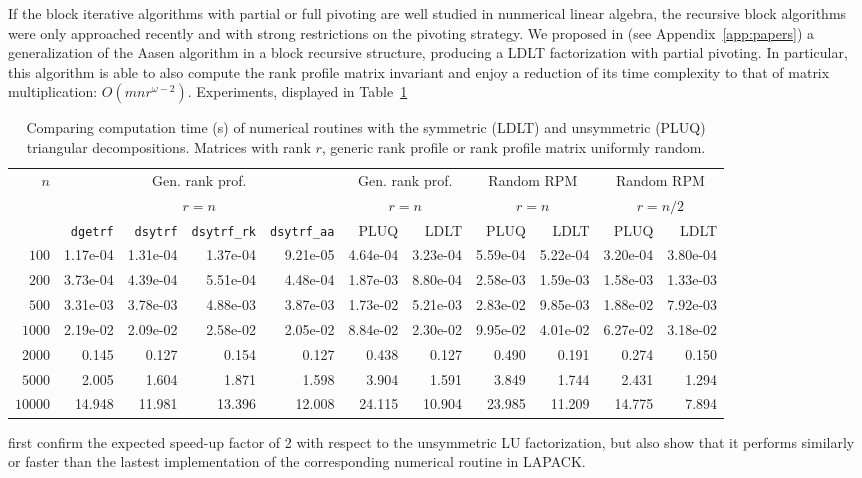 \documentclass{deliverablereport}
\begin{document}
If the block iterative algorithms with partial or full pivoting are well studied
in nunmerical linear algebra, the recursive block algorithms were only
approached recently and with strong restrictions on the pivoting strategy.
We proposed in \cite{DuPe18} (see Appendix~\ref{app:papers}) a generalization of the Aasen algorithm in a block
recursive structure, producing a LDLT factorization with partial pivoting. In
particular, this algorithm is able to also compute the rank profile matrix
invariant and enjoy a reduction of its time complexity to that of matrix
multiplication: $O(mnr^{\omega-2})$. Experiments, displayed in
Table~\ref{tab:ldlt}
%
\begin{table}[htb]\centering
  \footnotesize
    \begin{tabular}{rrrrrrrrrrr}
  \toprule
  \multirow{3}{*}{$n$} & 
  \multicolumn{4}{c}{Gen. rank prof.} & \multicolumn{2}{c}{Gen. rank prof.} &
  \multicolumn{2}{c}{Random RPM} & \multicolumn{2}{c}{Random RPM}\\
  &\multicolumn{4}{c}{ $r=n$}&\multicolumn{2}{c}{ $r=n$}&
  \multicolumn{2}{c}{ $r=n$}&\multicolumn{2}{c}{ $r=n/2$}\\
  & \texttt{dgetrf} & \texttt{dsytrf} & \texttt{dsytrf\_rk} & \texttt{dsytrf\_aa} & PLUQ & LDLT & PLUQ& LDLT & PLUQ & LDLT\\
  \midrule
$100$   & 1.17e-04 & 1.31e-04 & 1.37e-04 & 9.21e-05 & 4.64e-04 & 3.23e-04 & 5.59e-04 & 5.22e-04 & 3.20e-04 & 3.80e-04\\
$200$   & 3.73e-04 & 4.39e-04 & 5.51e-04 & 4.48e-04 & 1.87e-03 & 8.80e-04 & 2.58e-03 & 1.59e-03 & 1.58e-03 & 1.33e-03\\
$500$   & 3.31e-03 & 3.78e-03 & 4.88e-03 & 3.87e-03 & 1.73e-02 & 5.21e-03 & 2.83e-02 & 9.85e-03 & 1.88e-02 & 7.92e-03\\
$1000$  & 2.19e-02 & 2.09e-02 & 2.58e-02 & 2.05e-02 & 8.84e-02 & 2.30e-02 & 9.95e-02 & 4.01e-02 & 6.27e-02 & 3.18e-02\\
$2000$  & 0.145 & 0.127 & 0.154 & 0.127 & 0.438 & 0.127 & 0.490 & 0.191 & 0.274 & 0.150\\
$5000$  & 2.005 & 1.604 & 1.871 & 1.598 & 3.904 & 1.591 & 3.849 & 1.744 & 2.431 & 1.294\\
$10000$ & 14.948 & 11.981 & 13.396 & 12.008 & 24.115 & 10.904 & 23.985 & 11.209 & 14.775 & 7.894\\
  \bottomrule 
  \end{tabular}
  \caption{Comparing computation time (s) of numerical routines with the
    symmetric (LDLT) and unsymmetric (PLUQ) triangular decompositions. Matrices
    with rank $r$, generic rank profile or rank profile matrix uniformly
    random. }  
\label{tab:ldlt}
 \end{table}
%
first confirm the expected speed-up factor of 2 with respect
to the unsymmetric LU factorization, but also show that it performs similarly or
faster than the lastest implementation of the corresponding numerical routine in LAPACK.
\end{document}
